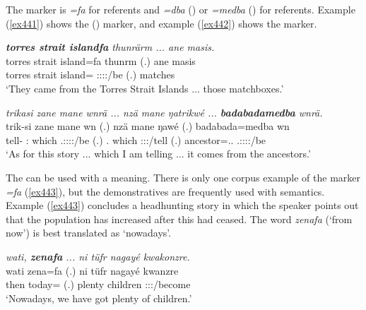 The   marker is \emph{=fa} for  referents and \emph{=dba} (\Sg) or \emph{=medba} (\Nsg) for  referents. Example (\ref{ex441}) shows the ()   marker, and example (\ref{ex442}) shows the    marker.

\begin{exe}
	\ex \emph{\textbf{torres strait islandfa} thunrärm ... ane masis.}\\
	\gll torres strait island=fa thunrm (.) ane masis\\
	torres strait island=\Abl{} \Stpl:\Sbj:\Pst:\Dur:\Venit/be (.) \Dem{} matches\\
	\trans `They came from the Torres Strait Islands ... those matchboxes.'\\
	\label{ex441}
\end{exe}
\begin{exe}
	\ex \emph{trikasi zane mane wnrä ... nzä mane ŋatrikwé ... \textbf{badabadamedba} wnrä.}\\
	\gll trik-si zane mane wn (.) nzä mane ŋawé (.) badabada=medba wn\\
	tell-\Nmlz{} \Dem:\Prox{} which \Tsg.\F:\Sbj:\Nonpast:\Ipfv:\Venit/be (.) \Fsg.\Abs{} which \Fsg:\Sbj:\Nonpast:\Ipfv/tell (.) ancestor=\Abl.\Anim.\Nsg{} \Tsg.\F:\Sbj:\Nonpast:\Ipfv:\Venit/be\\
	\trans `As for this story ... which I am telling ... it comes from the ancestors.'\\
	\label{ex442}
\end{exe}

The  can be used with a  meaning. There is only one corpus example of the  marker \emph{=fa} (\ref{ex443}), but the  demonstratives are frequently used with  semantics. Example (\ref{ex443}) concludes a headhunting story in which the speaker points out that the population has increased after this had ceased. The word \emph{zenafa} (`from now') is best translated as `nowadays'.
	
\begin{exe}
	\ex \emph{wati, \textbf{zenafa} ... ni tüfr nagayé kwakonzre.}\\
	\gll wati zena=fa (.) ni tüfr nagayé kwanzre\\
	then today=\Abl{} (.) \Fnsg{} plenty children \Fpl:\Sbj:\Rpst:\Ipfv/become\\
	\trans `Nowadays, we have got plenty of children.'
	\label{ex443}
\end{exe}

